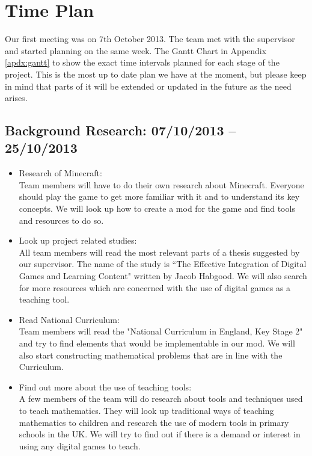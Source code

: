 \chapter{Time Plan}

Our first meeting was on 7th October 2013. The team met with the supervisor and started 
planning on the same week. The Gantt Chart in Appendix \ref{apdx:gantt} to show the 
exact time intervals planned for each stage of the project. This is the most up to date
plan we have at the moment, but please keep in mind that parts of it will be extended 
or updated in the future as the need arises.

\section{Background Research: 07/10/2013 -- 25/10/2013}
\begin{itemize}
\item{Research of Minecraft:\\Team members will have to do their own research about Minecraft. Everyone should play the game to get more familiar with it and to understand its key concepts. We will look up how to create a mod for the game and find tools and resources to do so.}

\item{Look up project related studies:\\All team members will read the most relevant parts of a thesis suggested by our supervisor. The name of the study is “The Effective Integration of Digital Games and Learning Content" written by Jacob Habgood. We will also search for more resources which are concerned with the use of digital games as a teaching tool.}


\item{Read National Curriculum:\\Team members will read the "National Curriculum in England, Key Stage 2" and try to find elements that would be implementable in our mod. We will also start constructing mathematical problems that are in line with the Curriculum.}

\item{Find out more about the use of teaching tools:\\A few members of the team will do research about tools and techniques used to teach mathematics. They will look up traditional ways of teaching mathematics to children and research the use of modern tools in primary schools in the UK. We will try to find out if there is a demand or interest in using any digital games to teach.}
\end{itemize}

